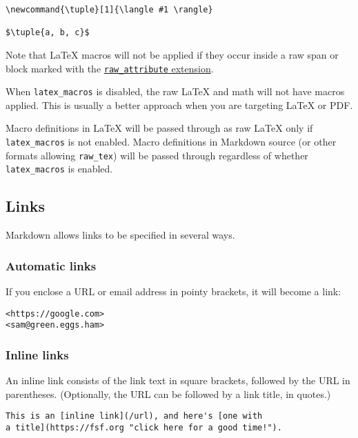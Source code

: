 \begin{verbatim}
\newcommand{\tuple}[1]{\langle #1 \rangle}

$\tuple{a, b, c}$
\end{verbatim}

Note that LaTeX macros will not be applied if they occur inside a raw
span or block marked with the
\protect\hyperlink{extension-raw_attribute}{\texttt{raw\_attribute}
extension}.

When \texttt{latex\_macros} is disabled, the raw LaTeX and math will not
have macros applied. This is usually a better approach when you are
targeting LaTeX or PDF.

Macro definitions in LaTeX will be passed through as raw LaTeX only if
\texttt{latex\_macros} is not enabled. Macro definitions in Markdown
source (or other formats allowing \texttt{raw\_tex}) will be passed
through regardless of whether \texttt{latex\_macros} is enabled.

\hypertarget{links-1}{%
\subsection{Links}\label{links-1}}

Markdown allows links to be specified in several ways.

\hypertarget{automatic-links}{%
\subsubsection{Automatic links}\label{automatic-links}}

If you enclose a URL or email address in pointy brackets, it will become
a link:

\begin{verbatim}
<https://google.com>
<sam@green.eggs.ham>
\end{verbatim}

\hypertarget{inline-links}{%
\subsubsection{Inline links}\label{inline-links}}

An inline link consists of the link text in square brackets, followed by
the URL in parentheses. (Optionally, the URL can be followed by a link
title, in quotes.)

\begin{verbatim}
This is an [inline link](/url), and here's [one with
a title](https://fsf.org "click here for a good time!").
\end{verbatim}

